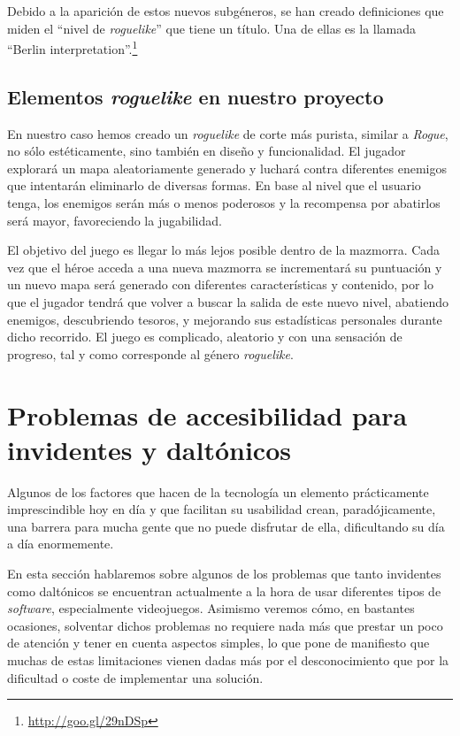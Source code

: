 Debido a la aparición de estos nuevos subgéneros, se han creado definiciones que miden el ``nivel de \textit{roguelike}'' que tiene un título. Una de ellas es la llamada ``Berlin interpretation''.\footnote{\url{http://goo.gl/29nDSp}}

\subsection{Elementos \textit{roguelike} en nuestro proyecto}

En nuestro caso hemos creado un \textit{roguelike} de corte más purista, similar a \textit{Rogue}, no sólo estéticamente, sino también en diseño y funcionalidad. El jugador explorará un mapa aleatoriamente generado y luchará contra diferentes enemigos que intentarán eliminarlo de diversas formas. En base al nivel que el usuario tenga, los enemigos serán más o menos poderosos y la recompensa por abatirlos será mayor, favoreciendo la jugabilidad.

El objetivo del juego es llegar lo más lejos posible dentro de la mazmorra. Cada vez que el héroe acceda a una nueva mazmorra se incrementará su puntuación y un nuevo mapa será generado con diferentes características y contenido, por lo que el jugador tendrá que volver a buscar la salida de este nuevo nivel, abatiendo enemigos, descubriendo tesoros, y mejorando sus estadísticas personales durante dicho recorrido. El juego es complicado, aleatorio y con una sensación de progreso, tal y como corresponde al género \textit{roguelike}.


\section{Problemas de accesibilidad para invidentes y daltónicos}
\label{sec:dificultadesfeedback}

Algunos de los factores que hacen de la tecnología un elemento prácticamente imprescindible hoy en día y que facilitan su usabilidad crean, paradójicamente, una barrera para mucha gente que no puede disfrutar de ella, dificultando su día a día enormemente.

En esta sección hablaremos sobre algunos de los problemas que tanto invidentes como daltónicos se encuentran actualmente a la hora de usar diferentes tipos de \textit{software}, especialmente videojuegos. Asimismo veremos cómo, en bastantes ocasiones, solventar dichos problemas no requiere nada más que prestar un poco de atención y tener en cuenta aspectos simples, lo que pone de manifiesto que muchas de estas limitaciones vienen dadas más por el desconocimiento que por la dificultad o coste de implementar una solución.

